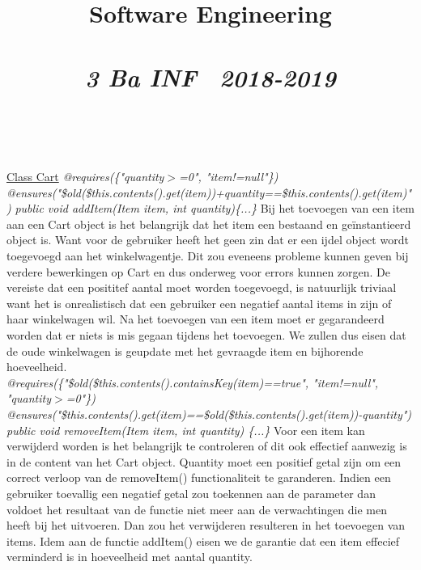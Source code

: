 \documentclass{article}
\title{\textmd{\textbf{Software Engineering}}\\\normalsize\vspace{0.1in}\Large{\assignmentname}\\\vspace{0.1in}\small{\textit{3 Ba INF \  2018-2019}}}
\author{\studentA \\ \studentB}
\begin{document}
\maketitle
\noindent
\underline{Class Cart}\newline
\textit{@requires(\{"quantity$>$=0", "item!=null"\})}\newline
\textit{@ensures("\$old(\$this.contents().get(item))+quantity==\$this.contents().get(item)")}\newline
\textit{public void addItem(Item item, int quantity)\{...\}}\newline
Bij het toevoegen van een item aan een Cart object is het belangrijk dat het item een bestaand en geïnstantieerd object is. Want voor de gebruiker heeft het geen zin dat er een ijdel object wordt toegevoegd aan het winkelwagentje. Dit zou eveneens probleme kunnen geven bij verdere bewerkingen op Cart en dus onderweg voor errors kunnen zorgen. De vereiste dat een posititef aantal moet worden toegevoegd, is natuurlijk triviaal want het is onrealistisch dat een gebruiker een negatief aantal items in zijn of haar winkelwagen wil.\newline
Na het toevoegen van een item moet er gegarandeerd worden dat er niets is mis gegaan tijdens het toevoegen. We zullen dus eisen dat de oude winkelwagen is geupdate met het gevraagde item en bijhorende hoeveelheid. \\

\noindent
\textit{@requires(\{"\$old(\$this.contents().containsKey(item)==true", "item!=null", "quantity$>$=0"\})} \newline
\textit{@ensures("\$this.contents().get(item)==\$old(\$this.contents().get(item))-quantity")} \newline
\textit{public void removeItem(Item item, int quantity) \{...\}} \newline
Voor een item kan verwijderd worden is het belangrijk te controleren of dit ook effectief aanwezig is in de content van het Cart object. Quantity moet een positief getal zijn om een correct verloop van de removeItem() functionaliteit te garanderen. Indien een gebruiker toevallig een negatief getal zou toekennen aan de parameter dan voldoet het resultaat van de functie niet meer aan de verwachtingen die men heeft bij het uitvoeren. Dan zou het verwijderen resulteren in het toevoegen van items. Idem aan de functie addItem() eisen we de garantie dat een item effecief verminderd is in hoeveelheid met aantal quantity. \\
\end{document}
